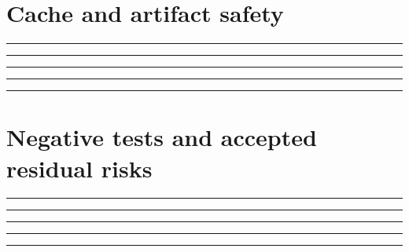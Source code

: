 \documentclass[11pt,letterpaper]{article}
\begin{document}
\section{Cache and artifact safety}
\vspace{2mm}
\noindent\rule{0.93\linewidth}{0.4pt}\par\vspace{13pt}
\noindent\rule{0.93\linewidth}{0.4pt}\par\vspace{13pt}
\noindent\rule{0.93\linewidth}{0.4pt}\par\vspace{13pt}
\noindent\rule{0.93\linewidth}{0.4pt}\par\vspace{13pt}
\noindent\rule{0.93\linewidth}{0.4pt}\par\vspace{13pt}
\section{Negative tests and accepted residual risks}
\vspace{2mm}
\noindent\rule{0.93\linewidth}{0.4pt}\par\vspace{13pt}
\noindent\rule{0.93\linewidth}{0.4pt}\par\vspace{13pt}
\noindent\rule{0.93\linewidth}{0.4pt}\par\vspace{13pt}
\noindent\rule{0.93\linewidth}{0.4pt}\par\vspace{13pt}
\noindent\rule{0.93\linewidth}{0.4pt}\par\vspace{13pt}
\end{document}
